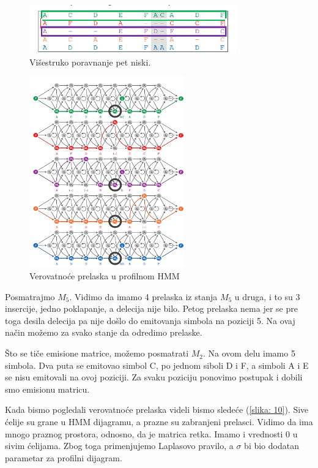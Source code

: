 \fi 

\begin{figure}[H]
	\centering
	\includegraphics[width=0.8\textwidth]{poglavlja/10/slike/slika11.png}
	\caption{Višestruko poravnanje pet niski.}
	\label{slika: 11}
\end{figure}

\begin{figure}[h]
	\centering
	\includegraphics[width=0.6\textwidth]{poglavlja/10/slike/slika8.png}
	\caption{Verovatnoće prelaska u profilnom HMM}
	\label{slika: 8}
\end{figure}


Posmatrajmo $M_5$. Vidimo da imamo 4 prelaska iz stanja $M_5$ u druga, i to su 3 insercije, jedno poklapanje, a delecija nije bilo. Petog prelaska nema jer se pre toga desila delecija pa nije došlo do emitovanja simbola na poziciji 5. Na ovaj način možemo za svako stanje da odredimo prelaske.


Što se tiče emisione matrice, možemo posmatrati $M_2$. Na ovom delu imamo 5 simbola. Dva puta se emitovao simbol C, po jednom siboli D i F, a simboli A i E se nisu emitovali na ovoj poziciji. Za svaku poziciju ponovimo postupak i dobili smo emisionu matricu.


Kada bismo pogledali verovatnoće prelaska videli bismo sledeće (\ref{slika: 10}). Sive ćelije su grane u HMM dijagramu, a prazne su zabranjeni prelasci. Vidimo da ima mnogo praznog prostora, odnosno, da je matrica retka. Imamo i vrednosti 0 u sivim ćelijama. Zbog toga primenjujemo Laplasovo pravilo, a $\sigma$ bi bio dodatan parametar za profilni dijagram.

